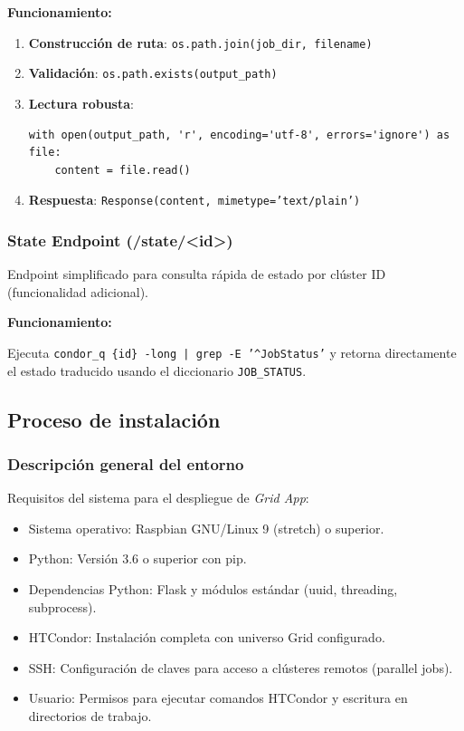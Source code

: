 \textbf{Funcionamiento:}

\begin{enumerate}
	\item \textbf{Construcción de ruta}: \texttt{os.path.join(job\_dir, filename)}

	\item \textbf{Validación}: \texttt{os.path.exists(output\_path)}

	\item \textbf{Lectura robusta}: 
	      \begin{verbatim}
with open(output_path, 'r', encoding='utf-8', errors='ignore') as file:
    content = file.read()
	      \end{verbatim}

	\item \textbf{Respuesta}: \texttt{Response(content, mimetype='text/plain')}
\end{enumerate}

\subsubsection{State Endpoint (/state/<id>)}
\noindent

Endpoint simplificado para consulta rápida de estado por clúster ID (funcionalidad adicional).

\textbf{Funcionamiento:}

Ejecuta \texttt{condor\_q \{id\} -long | grep -E '\^{}JobStatus'} y retorna directamente el estado traducido usando el diccionario \texttt{JOB\_STATUS}.

\subsection{Proceso de instalación}
\noindent

\subsubsection{Descripción general del entorno}
\noindent
Requisitos del sistema para el despliegue de \textit{Grid App}:

\begin{itemize}
	\item Sistema operativo: Raspbian GNU/Linux 9 (stretch) o superior.
	\item Python: Versión 3.6 o superior con pip.
	\item Dependencias Python: Flask y módulos estándar (uuid, threading, subprocess).
	\item HTCondor: Instalación completa con universo Grid configurado.
	\item SSH: Configuración de claves para acceso a clústeres remotos (parallel jobs).
	\item Usuario: Permisos para ejecutar comandos HTCondor y escritura en directorios de trabajo.
\end{itemize}

